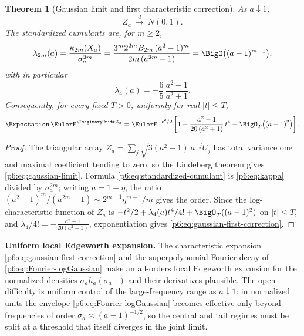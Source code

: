 \documentclass[11pt,oneside]{article}
\numberwithin{equation}{section}
\newtheorem{theorem}{Theorem}[section]
\theoremstyle{definition}
\theoremstyle{remark}
\begin{document}
\begin{theorem}[Gaussian limit and first characteristic correction]
\label{p6:thm:gaussian-limit}
As $a\downarrow1$,
\begin{equation}\label{p6:eq:gaussian-limit}
 Z_a\ \xrightarrow{\ d\ }\ N(0,1).
\end{equation}
The standardized cumulants are, for $m\ge2$,
\begin{equation}\label{p6:eq:standardized-cumulant}
 \lambda_{2m}(a)
 =\frac{\kappa_{2m}(X_a)}{\sigma_a^{2m}}
 =\frac{3^m2^{2m}B_{2m}\,(a^2-1)^m}{2m\,(a^{2m}-1)}
 =\BigO\bigl((a-1)^{m-1}\bigr),
\end{equation}
with in particular
\begin{equation}\label{p6:eq:lambda4}
 \lambda_4(a)=-\frac65\,\frac{a^2-1}{a^2+1}.
\end{equation}
Consequently, for every fixed $T>0$, uniformly for real $|t|\le T$,
\begin{equation}\label{p6:eq:gaussian-first-correction}
 \Expectation\,\EulerE^{\ImaginaryUnit tZ_a}
 =\EulerE^{-t^2/2}
 \left[1-\frac{a^2-1}{20\,(a^2+1)}\,t^4
 +\BigO_T\bigl((a-1)^2\bigr)\right].
\end{equation}
\end{theorem}

\begin{proof}
The triangular array $Z_a=\sum_j\sqrt{3(a^2-1)}\,a^{-j}U_j$ has total variance
one and maximal coefficient tending to zero, so the Lindeberg theorem gives
\eqref{p6:eq:gaussian-limit}.  Formula \eqref{p6:eq:standardized-cumulant} is
\eqref{p6:eq:kappa} divided by $\sigma_a^{2m}$; writing $a=1+\eta$, the ratio
$(a^2-1)^m/(a^{2m}-1)\sim2^{m-1}\eta^{m-1}/m$ gives the order.  Since the
log-characteristic function of $Z_a$ is
$-t^2/2+\lambda_4(a)t^4/4!+\BigO_T((a-1)^2)$ on $|t|\le T$, and
$\lambda_4/4!=-\tfrac{a^2-1}{20(a^2+1)}$, exponentiation gives
\eqref{p6:eq:gaussian-first-correction}.
\end{proof}

\begin{conjbox}
\textbf{Uniform local Edgeworth expansion.}
The characteristic expansion \eqref{p6:eq:gaussian-first-correction} and the
superpolynomial Fourier decay of \cref{p6:eq:Fourier-logGaussian} make an
all-orders local Edgeworth expansion for the normalized densities
$\sigma_ah_a(\sigma_a\,\cdot)$ and their derivatives plausible.  The open
difficulty is uniform control of the large-frequency range as $a\downarrow1$:
in normalized units the envelope \eqref{p6:eq:Fourier-logGaussian} becomes
effective only beyond frequencies of order
$\sigma_a\asymp(a-1)^{-1/2}$, so the central and tail regimes must be split at
a threshold that itself diverges in the joint limit.
\end{conjbox}
\end{document}
